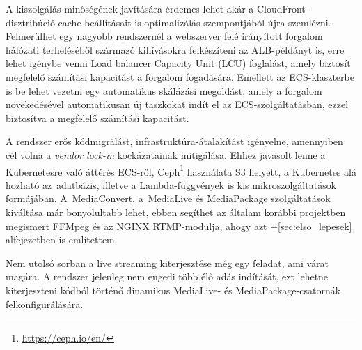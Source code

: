 A kiszolgálás minőségének javítására érdemes lehet akár a CloudFront-disztribúció cache beállításait is optimalizálás szempontjából újra szemlézni. Felmerülhet egy nagyobb rendszernél a webszerver felé irányított forgalom hálózati terheléséből származó kihívásokra felkészíteni az ALB-példányt is, erre lehet igénybe venni Load balancer Capacity Unit (LCU) foglalást, amely biztosít megfelelő számítási kapacitást a forgalom fogadására. Emellett az ECS-klaszterbe is be lehet vezetni egy automatikus skálázási megoldást, amely a forgalom növekedésével automatikusan új taszkokat indít el az ECS-szolgáltatásban, ezzel biztosítva a megfelelő számítási kapacitást.

A rendszer erős kódmigrálást, infrastruktúra-átalakítást igényelne, amennyiben cél volna a \emph{vendor lock-in}\cite{lockIn} kockázatainak mitigálása. Ehhez javasolt lenne a Kubernetesre való áttérés ECS-ről\cite{k8s}, Ceph\footnote{\url{https://ceph.io/en/}} használata S3 helyett, a Kubernetes alá hozható az~adatbázis, illetve a Lambda-függvények is kis mikroszolgáltatások formájában. A~MediaConvert, a~MediaLive és MediaPackage szolgáltatások kiváltása már bonyolultabb lehet, ebben segíthet az általam korábbi projektben megismert FFMpeg és az NGINX RTMP\leavevmode\hbox{-}modulja\cite{rtmpNginx}, ahogy azt \az+\ref{sec:elso_lepesek} alfejezetben is említettem.

Nem utolsó sorban a live streaming kiterjesztése még egy feladat, ami várat magára. A rendszer jelenleg nem engedi több élő adás indítását, ezt lehetne kiterjeszteni kódból történő dinamikus MediaLive- és MediaPackage-csatornák felkonfigurálására.
